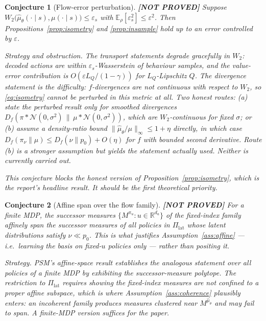 \documentclass[11pt]{article}
\theoremstyle{plain}
\newtheorem{conjecture}{Conjecture}
\theoremstyle{definition}
\theoremstyle{remark}
\newcommand{\R}{\mathbb R}
\newcommand{\E}{\mathbb E}
\newcommand{\1}{\mathbf 1}
\newcommand{\muhat}{\hat\mu_\theta}
\newcommand{\Piclat}{\Pi_{\mathrm{lat}}}
\newcommand{\NOTPROVED}{\textbf{\textup{[NOT PROVED]}}}
\begin{document}
\begin{conjecture}[Flow-error perturbation]
\label{conj:perturbation}
\NOTPROVED\;
Suppose $W_2\big(\muhat(\cdot\mid s),\mu(\cdot\mid s)\big)\le\varepsilon_s$ with
$\E_\rho[\varepsilon_s^2]\le\varepsilon^2$. Then Propositions~\ref{prop:isometry} and
\ref{prop:insample} hold up to an error controlled by $\varepsilon$.

\emph{Strategy and obstruction.} The transport statements degrade gracefully in $W_2$:
decoded actions are within $\varepsilon_s$-Wasserstein of behaviour samples, and the
value-error contribution is $O(\varepsilon L_Q/(1-\gamma))$ for $L_Q$-Lipschitz $Q$. The
\emph{divergence} statement is the difficulty: $f$-divergences are not continuous with
respect to $W_2$, so \eqref{eq:isometry} cannot be perturbed in this metric at all. Two
honest routes: (a) state the perturbed result only for smoothed divergences
$D_f(\pi*\mathcal N(0,\sigma^2)\,\|\,\mu*\mathcal N(0,\sigma^2))$, which are $W_2$-continuous
for fixed $\sigma$; or (b) assume a density-ratio bound
$\|\muhat/\mu\|_\infty\le 1+\eta$ directly, in which case
$D_f(\pi_\nu\|\mu)\le D_f(\nu\|p_0)+O(\eta)$ for $f$ with bounded second derivative. Route
(b) is a stronger assumption but yields the statement actually used. Neither is currently
carried out.

\emph{This conjecture blocks the honest version of Proposition~\ref{prop:isometry}}, which
is the report's headline result. It should be the first theoretical priority.
\end{conjecture}

\begin{conjecture}[Affine span over the flow family]
\label{conj:span}
\NOTPROVED\;
For a finite MDP, the successor measures $\{M^{\pi_u}:u\in\R^{d_a}\}$ of the fixed-index
family affinely span the successor measures of all policies in $\Piclat$ whose latent
distributions satisfy $\nu\ll p_0$. This is what justifies
Assumption~\ref{ass:affine} --- i.e.\ learning the basis on fixed-$u$ policies only ---
rather than positing it.

\emph{Strategy.} PSM's affine-space result establishes the analogous statement over all
policies of a finite MDP by exhibiting the successor-measure polytope. The restriction to
$\Piclat$ requires showing the fixed-index measures are not confined to a proper affine
subspace, which is where Assumption~\ref{ass:coherence} plausibly enters: an incoherent
family produces measures clustered near $M^{\muhat}$ and may fail to span. A finite-MDP
version suffices for the paper.
\end{conjecture}
\end{document}
